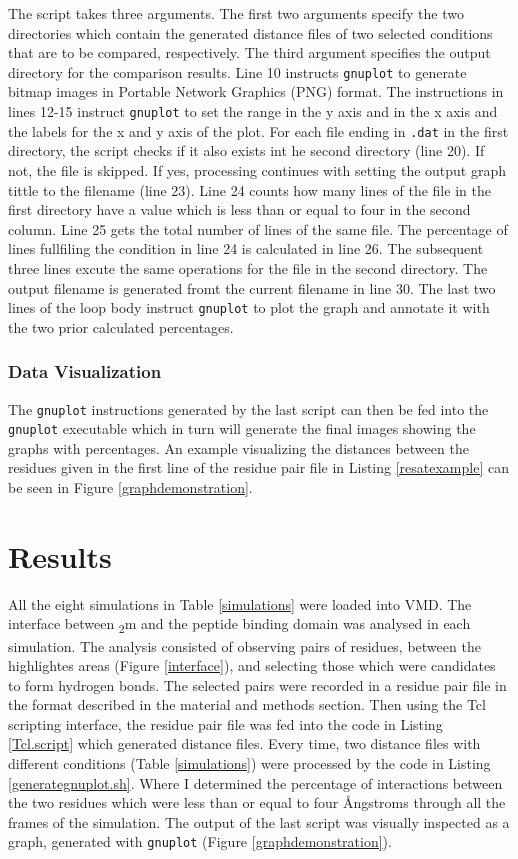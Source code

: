 \documentclass[11pt,twocolumn]{article}
\newcommand{\angstr}{{\AA}ngstroms\xspace}
\newcommand{\btm}{\textbeta\textsubscript{2}m\xspace}
\begin{document}
The script takes three arguments. The first two arguments specify the two directories which contain the generated distance files of two selected conditions that are to be compared, respectively. The third argument specifies the output directory for the comparison results. Line 10 instructs \texttt{gnuplot} to generate bitmap images in Portable Network Graphics (PNG) format. The instructions in lines 12-15 instruct \texttt{gnuplot} to set the range in the y axis and in the x axis  and the labels for the x and y axis of the plot.
For each file ending in \texttt{.dat} in the first directory, the script checks if it also exists int he second directory (line 20). If not, the file is skipped. If yes, processing continues with setting the output graph tittle to the filename (line 23). Line 24 counts how many lines of the file in the first directory have a value which is less than or equal to four in the second column. Line 25 gets the total number of lines of the same file. The percentage of lines fullfiling the condition in line 24 is calculated in line 26. The subsequent three lines excute the same operations for the file in the second directory. The output filename is generated fromt the current filename in line 30. The last two lines of the loop body instruct \texttt{gnuplot} to plot the graph and annotate it with the two prior calculated percentages.  

\subsubsection*{Data Visualization}

The \texttt{gnuplot} instructions generated by the last script can then be fed into the \texttt{gnuplot} executable which in turn will generate the final images showing the graphs with percentages. An example visualizing the distances between the residues given in the first line of the residue pair file in Listing \ref{resatexample} can be seen in Figure \ref{graphdemonstration}.


\section*{Results}

All the eight simulations in Table \ref{simulations} were loaded into VMD. The interface between \btm and the peptide binding domain was analysed in each simulation. The analysis consisted of observing pairs of residues, between the highlightes areas (Figure \ref{interface}), and selecting those which were candidates to form hydrogen bonds. 
The selected pairs were recorded in a residue pair file in the format described in the material and methods section. Then using the 
Tcl scripting interface, the residue pair file was fed into the code in Listing \ref{Tcl.script} which generated distance files. Every time, two distance files with different conditions (Table \ref{simulations}) were processed by the code in Listing \ref{generategnuplot.sh}. Where I determined the percentage of interactions between the two residues which were less than or equal to four \angstr through all the frames of the simulation. The output of the last script  was visually inspected as a graph, generated with \texttt{gnuplot} (Figure \ref{graphdemonstration}).
\end{document}
